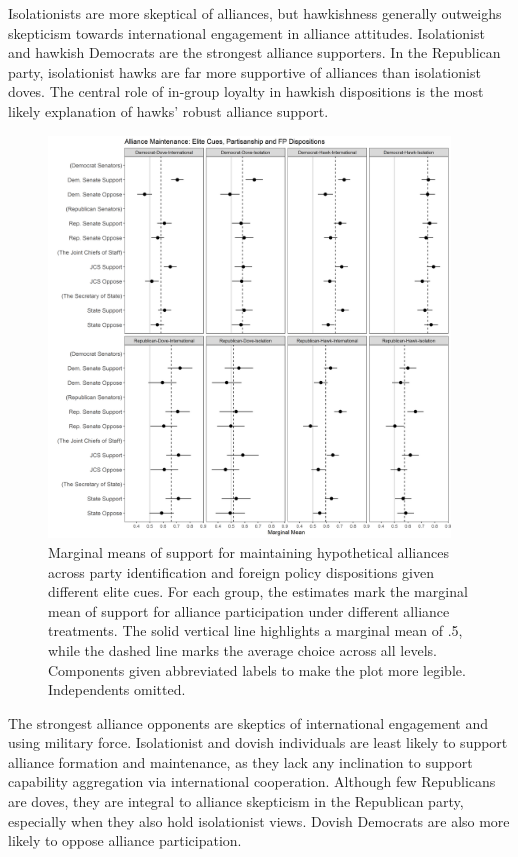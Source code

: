 \documentclass[12pt]{article}
\begin{document}
Isolationists are more skeptical of alliances, but hawkishness generally outweighs skepticism towards international engagement in alliance attitudes. 
Isolationist and hawkish Democrats are the strongest alliance supporters. 
In the Republican party, isolationist hawks are far more supportive of alliances than isolationist doves.
The central role of in-group loyalty in hawkish dispositions \citep{Kertzeretal2014} is the most likely explanation of hawks' robust alliance support. 


\begin{figure}
	\centering
		\includegraphics[width=0.95\textwidth]{../figures/party-dispo-main-el.png}
	\caption{Marginal means of support for maintaining hypothetical alliances across party identification and foreign policy dispositions given different elite cues. For each group, the estimates mark the marginal mean of support for alliance participation under different alliance treatments. The solid vertical line highlights a marginal mean of .5, while the dashed line marks the average choice across all levels. Components given abbreviated labels to make the plot more legible. Independents omitted.}
	\label{fig:party-dispo-main-el}
\end{figure}


The strongest alliance opponents are skeptics of international engagement and using military force. 
Isolationist and dovish individuals are least likely to support alliance formation and maintenance, as they lack any inclination to support capability aggregation via international cooperation.
Although few Republicans are doves, they are integral to alliance skepticism in the Republican party, especially when they also hold isolationist views.
Dovish Democrats are also more likely to oppose alliance participation.  
\end{document}
